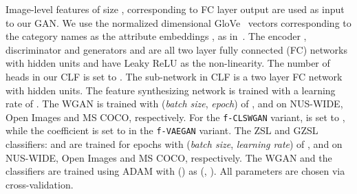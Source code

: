 \documentclass[final]{cvpr}
\newcommand{\clswgan}{\texttt{f-CLSWGAN}}
\newcommand{\vaegan}{\texttt{f-VAEGAN}}
\begin{document}
Image-level features of size , corresponding to FC layer output are used as input to our GAN. We use the  normalized  dimensional GloVe~\cite{pennington2014glove} vectors corresponding to the category names as the attribute embeddings , as in~\cite{huynh2020shared}. The encoder , discriminator  and generators  and  are all two layer fully connected (FC) networks with  hidden units and have Leaky ReLU as the non-linearity. The number of heads  in our CLF is set to . The sub-network  in CLF is a two layer FC network with  hidden units. 
The feature synthesizing network is trained with a learning rate of . The WGAN is trained with (\textit{batch size}, \textit{epoch}) of ,  and  on NUS-WIDE, Open Images and MS COCO, respectively. For the \clswgan{} variant,  is set to , while the coefficient  is set to  in the \vaegan{} variant. The ZSL and GZSL classifiers:  and  are trained for  epochs with (\textit{batch size}, \textit{learning rate}) of ,  and  on NUS-WIDE, Open Images and MS COCO, respectively. The WGAN and the classifiers are trained using ADAM  with () as (, ). All parameters are chosen via cross-validation.
\end{document}
